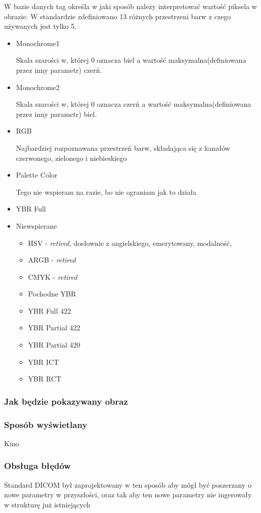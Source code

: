 W bazie danych tag  określa w jaki sposób należy interpretować wartość piksela w obrazie.
W standardzie zdefiniowano 13 różnych przestrzeni barw  z czego używanych jest tylko 5.

\begin{itemize}
    \item Monochrome1

    Skala szarości w, której 0 oznacza biel a wartość maksymalna(definiowana przez inny parametr) czerń.

    \item Monochrome2

    Skala szarości w, której 0 oznacza czerń a wartość maksymalna(definiowana przez inny parametr) biel.

    \item RGB

    Najbardziej rozpoznawana przestrzeń barw, składająca się z kanałów czerwonego, zielonego i niebieskiego

    \item Palette Color

    Tego nie wspieram na razie, bo nie ograniam jak to działa

    \item YBR Full


    \item Niewspierane
    \begin{itemize}
        \item HSV - \textit{retired}, dosłownie z angielskiego, emerytowany, modalność,
        \item ARGB - \textit{retired}
        \item CMYK - \textit{retired}
        \item Pochodne YBR
        \item YBR Full 422
        \item YBR Partial 422
        \item YBR Partial 420
        \item YBR ICT
        \item YBR RCT

    \end{itemize}

\end{itemize}

\subsubsection{Jak będzie pokazywany obraz}

\subsubsection{Sposób wyświetlany}

Kino

\subsubsection{Obsługa błędów}

Standard DICOM był zaprojektowany w ten sposób aby mógł być poszerzany o nowe parametry w przyszłości, oraz tak aby ten nowe parametry nie ingerowały w strukturę już istniejących
